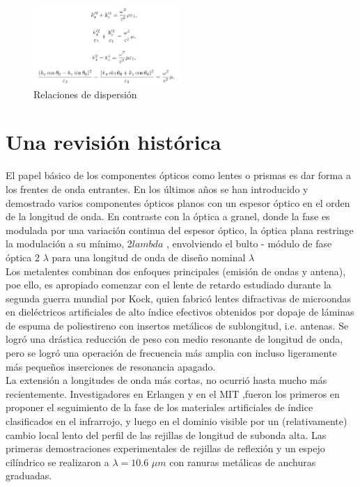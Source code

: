 \documentclass[a4paper, twocolumn, 10pt]{article}
\begin{document}
\begin{figure}[H]
    \centering
    \includegraphics[width= 0.5\textwidth]{yaaaa.png}
    \caption{Relaciones de dispersión}
    \label{metasuperficie}
\end{figure}

\section{\textbf{Una revisión histórica}}

\noindent El papel básico de los componentes ópticos como lentes o prismas es dar forma a los frentes de onda entrantes. En los últimos años se han introducido y demostrado varios componentes ópticos planos con un espesor óptico en el orden de la longitud de onda. En contraste con la óptica a granel, donde la fase es modulada por una variación continua del espesor óptico, la óptica plana restringe la modulación a su mínimo, 2$ lambda$ , envolviendo el bulto - módulo de fase óptica 2 $ \lambda$ para una longitud de onda de diseño nominal $ \lambda$\\
\noindent Los metalentes combinan dos enfoques principales (emisión de ondas y antena), poe ello, es apropiado comenzar con el lente de retardo estudiado durante la segunda guerra mundial por Kock, quien fabricó lentes difractivas de microondas en dieléctricos artificiales de alto índice efectivos obtenidos por dopaje de láminas de espuma de poliestireno con insertos metálicos de sublongitud, i.e. antenas. Se logró una drástica reducción de peso con medio resonante de longitud de onda, pero se logró una operación de frecuencia más amplia con incluso ligeramente más pequeños inserciones de resonancia apagado.\\

\noindent La extensión a longitudes de onda más cortas, no ocurrió hasta mucho más recientemente. Investigadores en Erlangen y en el MIT ,fueron los primeros en proponer el seguimiento de la fase de los materiales artificiales de índice clasificados en el infrarrojo, y luego en el dominio visible por un (relativamente) cambio local lento del perfil de las rejillas de longitud de subonda alta. Las primeras demostraciones experimentales de rejillas de reflexión y un espejo cilíndrico se realizaron a $ \lambda = 10.6$ $\mu m$ con ranuras metálicas de anchuras graduadas.\\
\end{document}
